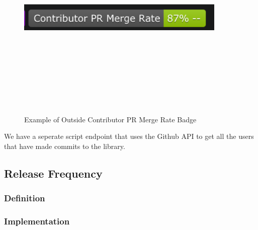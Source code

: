 \documentclass[12pt, letterpaper]{article}
\begin{document}
\begin{figure}[!htb]
    \centerline{
        \includegraphics[width=10cm,height=10cm,keepaspectratio=true]{prbadge}
    }
    \caption{
        Example of Outside Contributor PR Merge Rate Badge 
    }
    \label{prbadge}
\end{figure}
We have a seperate script endpoint that uses the Github \cite{github} API to get all the users
that have made commits to the library. 


\subsection{Release Frequency}
\subsubsection{Definition}


\subsubsection{Implementation}
\end{document}
